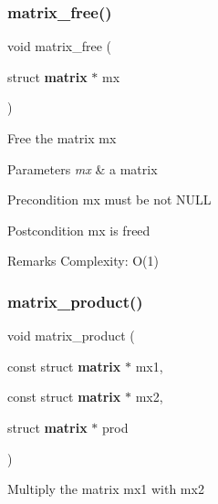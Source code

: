 \subsubsection{matrix\+\_\+free()}
{\footnotesize\ttfamily void matrix\+\_\+free (\begin{DoxyParamCaption}\item[{struct \textbf{ matrix} $\ast$}]{mx }\end{DoxyParamCaption})\hspace{0.3cm}{\ttfamily [inline]}}

Free the matrix {\ttfamily mx}


\begin{DoxyParams}{Parameters}
{\em mx} & a matrix\\
\hline
\end{DoxyParams}
\begin{DoxyPrecond}{Precondition}
{\ttfamily mx} must be not N\+U\+LL
\end{DoxyPrecond}
\begin{DoxyPostcond}{Postcondition}
{\ttfamily mx} is freed
\end{DoxyPostcond}
\begin{DoxyRemark}{Remarks}
Complexity\+: O(1) 
\end{DoxyRemark}
\mbox{\label{matrix_8h_a48e828fb00afc50e3616adefe87643bf}} 
\subsubsection{matrix\+\_\+product()}
{\footnotesize\ttfamily void matrix\+\_\+product (\begin{DoxyParamCaption}\item[{const struct \textbf{ matrix} $\ast$}]{mx1,  }\item[{const struct \textbf{ matrix} $\ast$}]{mx2,  }\item[{struct \textbf{ matrix} $\ast$}]{prod }\end{DoxyParamCaption})}

Multiply the matrix {\ttfamily mx1} with {\ttfamily mx2}


